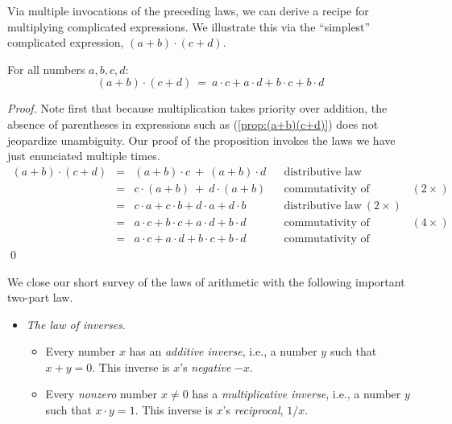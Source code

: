 Via multiple invocations of the preceding laws, we can derive a recipe
for multiplying complicated expressions.  We illustrate this via the
``simplest'' complicated expression, $(a+b) \cdot (c+d)$.

\begin{prop}
\label{prop:(a+b)(c+d)}
For all numbers $a, b, c, d$:
\begin{equation}
\label{eq:(a+b)(c+d)}
(a+b) \cdot (c+d) \ = \ a \cdot c + a \cdot d + b \cdot c + b \cdot d
\end{equation}
\end{prop}

\begin{proof}
Note first that because multiplication takes priority over addition,
the absence of parentheses in expressions such as
(\ref{prop:(a+b)(c+d)}) does not jeopardize unambiguity.  Our proof of
the proposition invokes the laws we have just enunciated multiple
times.
\[
\begin{array}{lclll}
(a+b) \cdot (c+d) & = & (a+b) \cdot c \ + \ (a+b) \cdot d
& & \mbox{distributive law} \\ 
  & = & c \cdot (a+b) \ + \ d \cdot (a+b)
& & \mbox{commutativity of multiplication} \ (2 \times) \\
  & = & c \cdot a + c \cdot b + d \cdot a + d \cdot b 
& & \mbox{distributive law} \ (2 \times) \\
  & = & a \cdot c + b \cdot c + a \cdot d + b \cdot d
& & \mbox{commutativity of multiplication} \ (4 \times) \\
  & = &  a \cdot c + a \cdot d + b \cdot c + b \cdot d
& & \mbox{commutativity of addition}
\end{array}
\]
\qed
\end{proof}


We close our short survey of the laws of arithmetic with the following
important two-part law.
\begin{itemize}
\item
{\it The law of inverses}.
%
  \begin{itemize}
  \item
Every number $x$ has an {\em additive inverse},
i.e., a number $y$ such that $x+y =0$.  This inverse is $x$'s {\it
  negative} $-x$.
  \item
Every {\em nonzero} number $x \neq 0$ has a {\em multiplicative
  inverse}, i.e., a number $y$ such that
$x \cdot y = 1$.  This inverse is $x$'s {\it reciprocal},
$1/x$.
  \end{itemize}
\end{itemize}

